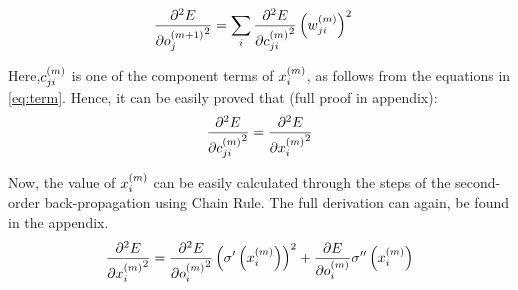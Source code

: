 \begin{align}
\pdv[2]{E}{{o_{j}^{(m+1)}}} &= \sum_i
\pdv[2]{E}{{c_{ji}^{(m)}}} \left({w_{ji}^{(m)}}\right)^2
\end{align} 

Here,$c_{ji}^{(m)}$ is one of the component terms of $x_{i}^{(m)}$, as follows from the equations in \ref{eq:term}. Hence, it can be easily proved that (full proof in appendix):
\begin{align}
\pdv[2]{E}{{c_{ji}^{(m)}}} = \pdv[2]{E}{{x_{i}^{(m)}}}
\end{align}

Now, the value of $x_{i}^{(m)}$ can be easily calculated through the steps of the second-order back-propagation using Chain Rule. The full derivation can again, be found in the appendix.
\begin{align}
\pdv[2]{E}{{x_{i}^{(m)}}}=\pdv[2]{E}{{o_{i}^{(m)}}} \left(\sigma^{\prime}\left({x_{i}^{(m)}}\right)\right)^2
+
\pdv{E}{{o_{i}^{(m)}}}\sigma^{\prime\prime}\left(x_{i}^{(m)}\right)
\end{align}
